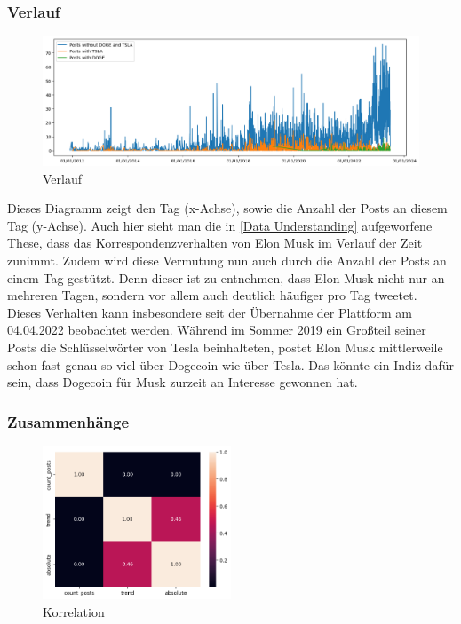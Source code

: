 \documentclass{article}
\begin{document}
\subsubsection{Verlauf} \label{Verlauf}
\begin{figure}[!htb]
  	\includegraphics[width=\textwidth, center]{../imgs/Verlauf.png}
 	\caption{Verlauf}
 	\label{fig:FigVerlauf}
\end{figure}
Dieses Diagramm zeigt den Tag (x-Achse), sowie die Anzahl der Posts an diesem Tag (y-Achse). Auch hier sieht man die in \ref{Data Understanding} aufgeworfene These, dass das Korrespondenzverhalten von Elon Musk im Verlauf der Zeit zunimmt.
Zudem wird diese Vermutung nun auch durch die Anzahl der Posts an einem Tag gestützt.
Denn dieser ist zu entnehmen, dass Elon Musk nicht nur an mehreren Tagen, sondern vor allem auch deutlich häufiger pro Tag tweetet.
Dieses Verhalten kann insbesondere seit der Übernahme der Plattform am 04.04.2022 beobachtet werden.
Während im Sommer 2019 ein Großteil seiner Posts die Schlüsselwörter von Tesla beinhalteten, postet Elon Musk mittlerweile schon fast genau so viel über Dogecoin wie über Tesla. Das könnte ein Indiz dafür sein, dass Dogecoin für Musk zurzeit an Interesse gewonnen hat.

\subsubsection{Zusammenhänge} \label{Zusammenhänge}
\begin{figure}[!htb]
	

    		\includegraphics[width=0.5\textwidth, center]{../imgs/Korrelation.png}
    		\caption{Korrelation}
    		\label{fig:Korrelation}

	
		
\end{figure}
\end{document}
